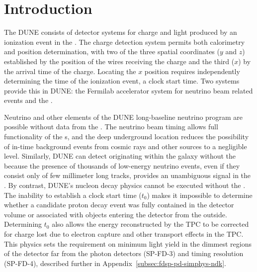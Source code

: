 \newcommand{\tzero}{\ensuremath{t_0}\xspace}

\section{Introduction} %
\label{sec:fdsp-pd-intro}

The DUNE  consists of detector systems for charge and light produced by an ionization event in the \lartpc.  The charge detection system permits both calorimetry and position determination, with two of the three spatial coordinates ($y$ and $z$)  established by the position of the  wires receiving the charge and the third ($x$) by the arrival time of the charge.  Locating the $x$ position requires independently determining the time of the ionization event, a clock start time.  Two systems provide this in DUNE:  the Fermilab accelerator system for neutrino beam related events and the .  

Neutrino  and other elements of the DUNE long-baseline neutrino program are possible without data from the .  The neutrino beam timing allows full functionality of the s, and the deep underground location reduces the possibility of in-time background events from cosmic rays and other sources to a negligible level.  
Similarly, DUNE can detect  originating within the galaxy without the  because the presence of thousands of low-energy neutrino events, even if they consist only of few millimeter long tracks, provides an unambiguous signal in the .
By contrast, DUNE's nucleon decay physics cannot be executed without the .  The inability to establish a clock start time (\tzero) makes it impossible to determine whether a candidate proton decay event was fully contained in the detector volume or associated with objects entering the detector from the outside.  Determining \tzero also allows the energy reconstructed by the TPC to be corrected for charge lost due to electron capture and other transport effects in the TPC. This physics sets the requirement on minimum light yield in the dimmest regions of the detector far from the photon detectors (SP-FD-3) and timing resolution (SP-FD-4), described further in Appendix~\ref{subsec:fdsp-pd-simphys-ndk}.

